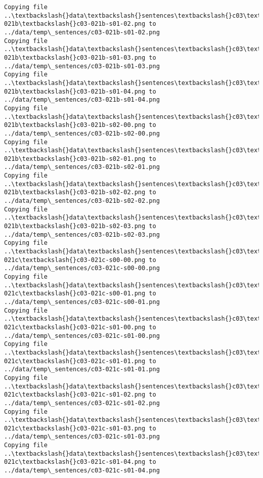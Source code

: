 \documentclass[11pt]{article}
\begin{document}
\begin{Verbatim}[commandchars=\\\{\}]
Copying file ..\textbackslash{}data\textbackslash{}sentences\textbackslash{}c03\textbackslash{}c03-021b\textbackslash{}c03-021b-s01-02.png to
../data/temp\_sentences/c03-021b-s01-02.png
Copying file ..\textbackslash{}data\textbackslash{}sentences\textbackslash{}c03\textbackslash{}c03-021b\textbackslash{}c03-021b-s01-03.png to
../data/temp\_sentences/c03-021b-s01-03.png
Copying file ..\textbackslash{}data\textbackslash{}sentences\textbackslash{}c03\textbackslash{}c03-021b\textbackslash{}c03-021b-s01-04.png to
../data/temp\_sentences/c03-021b-s01-04.png
Copying file ..\textbackslash{}data\textbackslash{}sentences\textbackslash{}c03\textbackslash{}c03-021b\textbackslash{}c03-021b-s02-00.png to
../data/temp\_sentences/c03-021b-s02-00.png
Copying file ..\textbackslash{}data\textbackslash{}sentences\textbackslash{}c03\textbackslash{}c03-021b\textbackslash{}c03-021b-s02-01.png to
../data/temp\_sentences/c03-021b-s02-01.png
Copying file ..\textbackslash{}data\textbackslash{}sentences\textbackslash{}c03\textbackslash{}c03-021b\textbackslash{}c03-021b-s02-02.png to
../data/temp\_sentences/c03-021b-s02-02.png
Copying file ..\textbackslash{}data\textbackslash{}sentences\textbackslash{}c03\textbackslash{}c03-021b\textbackslash{}c03-021b-s02-03.png to
../data/temp\_sentences/c03-021b-s02-03.png
Copying file ..\textbackslash{}data\textbackslash{}sentences\textbackslash{}c03\textbackslash{}c03-021c\textbackslash{}c03-021c-s00-00.png to
../data/temp\_sentences/c03-021c-s00-00.png
Copying file ..\textbackslash{}data\textbackslash{}sentences\textbackslash{}c03\textbackslash{}c03-021c\textbackslash{}c03-021c-s00-01.png to
../data/temp\_sentences/c03-021c-s00-01.png
Copying file ..\textbackslash{}data\textbackslash{}sentences\textbackslash{}c03\textbackslash{}c03-021c\textbackslash{}c03-021c-s01-00.png to
../data/temp\_sentences/c03-021c-s01-00.png
Copying file ..\textbackslash{}data\textbackslash{}sentences\textbackslash{}c03\textbackslash{}c03-021c\textbackslash{}c03-021c-s01-01.png to
../data/temp\_sentences/c03-021c-s01-01.png
Copying file ..\textbackslash{}data\textbackslash{}sentences\textbackslash{}c03\textbackslash{}c03-021c\textbackslash{}c03-021c-s01-02.png to
../data/temp\_sentences/c03-021c-s01-02.png
Copying file ..\textbackslash{}data\textbackslash{}sentences\textbackslash{}c03\textbackslash{}c03-021c\textbackslash{}c03-021c-s01-03.png to
../data/temp\_sentences/c03-021c-s01-03.png
Copying file ..\textbackslash{}data\textbackslash{}sentences\textbackslash{}c03\textbackslash{}c03-021c\textbackslash{}c03-021c-s01-04.png to
../data/temp\_sentences/c03-021c-s01-04.png

\end{Verbatim}
\end{document}
